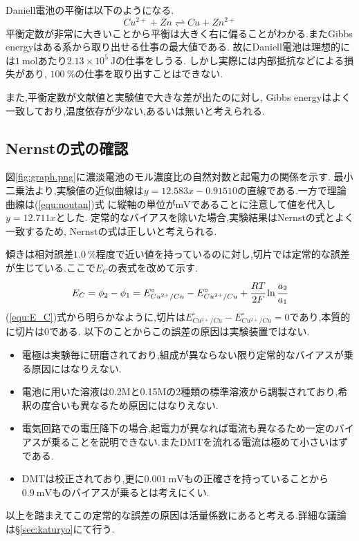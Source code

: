 Daniell電池の平衡は以下のようになる.
\begin{equation}
  \label{equ:daniellheiko}
  Cu^{2+}+Zn \rightleftharpoons Cu+Zn^{2+}
\end{equation}
平衡定数が非常に大きいことから平衡は大きく右に偏ることがわかる.またGibbs energyはある系から取り出せる仕事の最大値である\cite{kagakunetu}.
故にDaniell電池は理想的には$1\ \si{\mole}$あたり$2.13\times10^5\ \si{\joule}$の仕事をしうる.
しかし実際には内部抵抗などによる損失があり, $100\ \%$の仕事を取り出すことはできない.

また,平衡定数が文献値と実験値で大きな差が出たのに対し, Gibbs energyはよく一致しており,温度依存が少ない,あるいは無いと考えられる.
\subsection{Nernstの式の確認}
\label{sec:Nernst}
図\ref{fig:graph.png}に濃淡電池のモル濃度比の自然対数と起電力の関係を示す.
最小二乗法より,実験値の近似曲線は$y=12.583x-0.91510$の直線である.一方で理論曲線は(\ref{equ:noutan})式
に縦軸の単位が$\si{\milli\volt}$であることに注意して値を代入し$y=12.711x$とした.
定常的なバイアスを除いた場合,実験結果はNernstの式とよく一致するため, Nernstの式は正しいと考えられる.

傾きは相対誤差$1.0\ \%$程度で近い値を持っているのに対し,切片では定常的な誤差が生じている.ここで$E_C$の表式を改めて示す.
\begin{equation}
  \label{equ:E_C}
  E_C=\phi_2-\phi_1=E^{\circ}_{Cu^{2+}/Cu}-E^{\circ}_{Cu^{2+}/Cu}+\cfrac{RT}{2F}\ln \cfrac{a_2}{a_1}
\end{equation}
(\ref{equ:E_C})式から明らかなように,切片は$E^{\circ}_{Cu^{2+}/Cu}-E^{\circ}_{Cu^{2+}/Cu}=0$であり,本質的に切片は0である.
以下のことからこの誤差の原因は実験装置ではない.
\begin{itemize}
  \item 電極は実験毎に研磨されており,組成が異ならない限り定常的なバイアスが乗る原因にはなりえない.
  \item 電池に用いた溶液は0.2Mと0.15Mの2種類の標準溶液から調製されており,希釈の度合いも異なるため原因にはなりえない.
  \item 電気回路での電圧降下の場合,起電力が異なれば電流も異なるため一定のバイアスが乗ることを説明できない.またDMTを流れる電流は極めて小さいはずである.
  \item DMTは校正されており,更に$0.001\ \si{\milli\volt}$もの正確さを持っていることから$0.9\ \si{\milli\volt}$ものバイアスが乗るとは考えにくい.
\end{itemize}
以上を踏まえてこの定常的な誤差の原因は活量係数にあると考える.詳細な議論は\S\ref{sec:katuryo}にて行う.
